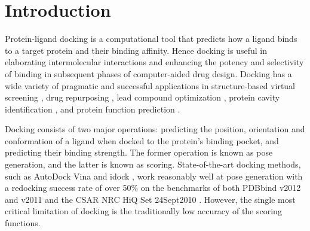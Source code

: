 \documentclass[twocolumn]{bmcart}
\begin{document}


\section*{Introduction}

Protein-ligand docking is a computational tool that predicts how a ligand binds to a target protein and their binding affinity. Hence docking is useful in elaborating intermolecular interactions and enhancing the potency and selectivity of binding in subsequent phases of computer-aided drug design. Docking has a wide variety of pragmatic and successful applications in structure-based virtual screening \cite{1383}, drug repurposing \cite{1384}, lead compound optimization \cite{1385}, protein cavity identification \cite{1217}, and protein function prediction \cite{1386}.

Docking consists of two major operations: predicting the position, orientation and conformation of a ligand when docked to the protein's binding pocket, and predicting their binding strength. The former operation is known as pose generation, and the latter is known as scoring. State-of-the-art docking methods, such as AutoDock Vina \cite{595} and idock \cite{1153}, work reasonably well at pose generation with a redocking success rate of over 50\% \cite{1362} on the benchmarks of both PDBbind v2012 and v2011 \cite{529,530} and the CSAR NRC HiQ Set 24Sept2010 \cite{857,960}. However, the single most critical limitation of docking is the traditionally low accuracy of the scoring functions.
\end{document}

